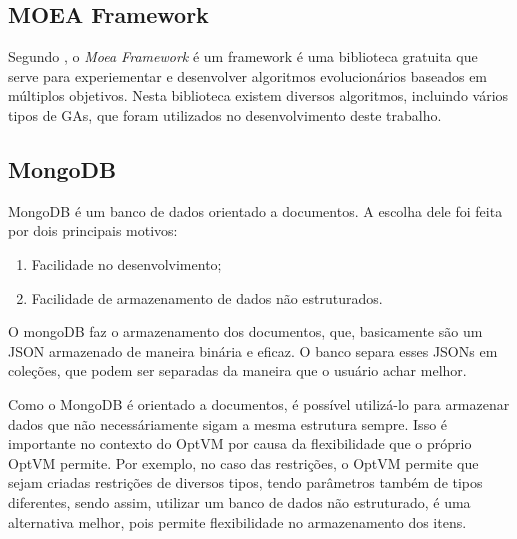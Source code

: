 \subsection{MOEA Framework}
Segundo \cite{moea}, o \textit{Moea Framework} é um framework é uma
biblioteca gratuita que serve para experiementar e desenvolver
algoritmos evolucionários baseados em múltiplos objetivos. Nesta biblioteca
existem diversos algoritmos, incluindo vários tipos de GAs, que foram utilizados
no desenvolvimento deste trabalho.

\subsection{MongoDB}
MongoDB é um banco de dados orientado a documentos. A escolha dele foi
feita por dois principais motivos:

\begin{enumerate}
  \item Facilidade no desenvolvimento;
  \item Facilidade de armazenamento de dados não estruturados.
\end{enumerate}

O mongoDB faz o armazenamento dos documentos, que, basicamente são um JSON
armazenado de maneira binária e eficaz. O banco separa esses JSONs em coleções,
que podem ser separadas da maneira que o usuário achar melhor.

Como o MongoDB é orientado a documentos, é possível utilizá-lo para armazenar
dados que não necessáriamente sigam a mesma estrutura sempre. Isso é importante no contexto do
OptVM por causa da flexibilidade que o próprio OptVM permite. Por exemplo, no
caso das restrições, o OptVM permite que sejam criadas restrições de diversos tipos,
tendo parâmetros também de tipos diferentes, sendo assim, utilizar um banco de 
dados não estruturado, é uma alternativa melhor, pois permite flexibilidade no armazenamento
dos itens.
